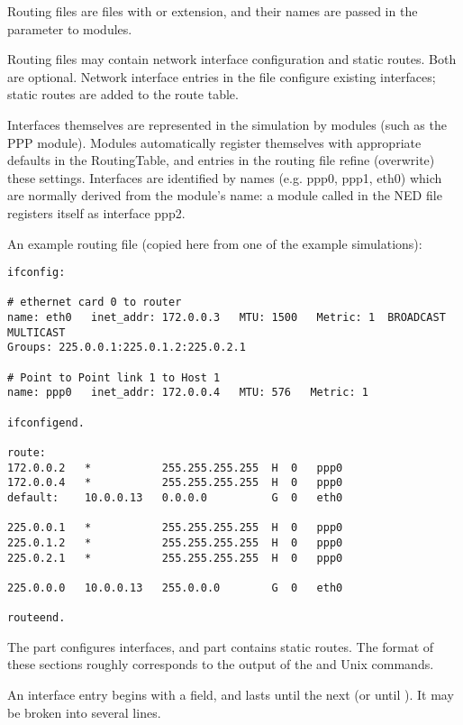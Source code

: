 Routing files are files with  or  extension,
and their names are passed in the  parameter
to  modules.

Routing files may contain network interface configuration and static
routes. Both are optional. Network interface entries in the file
configure existing interfaces; static routes are added to the route table.

Interfaces themselves are represented in the simulation by modules
(such as the PPP module). Modules automatically register themselves
with appropriate defaults in the RoutingTable, and entries in the
routing file refine (overwrite) these settings.
Interfaces are identified by names (e.g. ppp0, ppp1, eth0) which
are normally derived from the module's name: a module called
 in the NED file registers itself as interface ppp2.

An example routing file (copied here from one of the example simulations):

\begin{verbatim}
ifconfig:

# ethernet card 0 to router
name: eth0   inet_addr: 172.0.0.3   MTU: 1500   Metric: 1  BROADCAST MULTICAST
Groups: 225.0.0.1:225.0.1.2:225.0.2.1

# Point to Point link 1 to Host 1
name: ppp0   inet_addr: 172.0.0.4   MTU: 576   Metric: 1

ifconfigend.

route:
172.0.0.2   *           255.255.255.255  H  0   ppp0
172.0.0.4   *           255.255.255.255  H  0   ppp0
default:    10.0.0.13   0.0.0.0          G  0   eth0

225.0.0.1   *           255.255.255.255  H  0   ppp0
225.0.1.2   *           255.255.255.255  H  0   ppp0
225.0.2.1   *           255.255.255.255  H  0   ppp0

225.0.0.0   10.0.0.13   255.0.0.0        G  0   eth0

routeend.
\end{verbatim}

The  part configures interfaces,
and  part contains static routes.
The format of these sections roughly corresponds to the output
of the  and  Unix commands.

An interface entry begins with a  field, and lasts until
the next  (or until ). It may
be broken into several lines.


